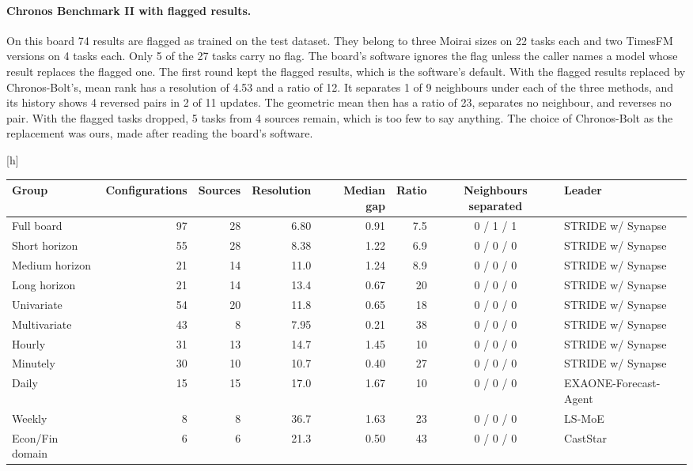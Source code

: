 \documentclass{article}
\makeatletter
\renewenvironment{table}
  {\setlength{\abovecaptionskip}{6\p@}%
   \setlength{\belowcaptionskip}{\z@}%
   \@float{table}}
  {\end@float}
\makeatother
\begin{document}
\paragraph{Chronos Benchmark II with flagged results.} On this board 74 results are flagged as
trained on the test dataset. They belong to three Moirai sizes on 22 tasks each and two TimesFM
versions on 4 tasks each. Only 5 of the 27 tasks carry no flag. The board's software
ignores the flag unless the caller names a model whose result replaces the flagged one. The
first round kept the flagged results, which is the software's default. With the flagged results
replaced by Chronos-Bolt's, mean rank has a resolution of 4.53 and a ratio of 12. It separates
1 of 9 neighbours under each of the three methods, and its history shows 4 reversed pairs in 2
of 11 updates. The geometric mean then has a ratio of 23, separates no neighbour, and reverses
no pair. With the flagged tasks dropped, 5 tasks from 4 sources remain, which is too few to say
anything. The choice of Chronos-Bolt as the replacement was ours, made after reading the
board's software.

\begin{table}[h]
\centering
\scriptsize
\setlength{\tabcolsep}{4pt}
\begin{tabular}{@{}lrrrrrcl@{}}
\toprule
\textbf{Group} & \textbf{Configurations} & \textbf{Sources} & \textbf{Resolution} &
\textbf{Median gap} & \textbf{Ratio} & \textbf{Neighbours separated} & \textbf{Leader} \\
\midrule
Full board & 97 & 28 & 6.80 & 0.91 & 7.5 & 0 / 1 / 1 & STRIDE w/ Synapse \\
Short horizon & 55 & 28 & 8.38 & 1.22 & 6.9 & 0 / 0 / 0 & STRIDE w/ Synapse \\
Medium horizon & 21 & 14 & 11.0 & 1.24 & 8.9 & 0 / 0 / 0 & STRIDE w/ Synapse \\
Long horizon & 21 & 14 & 13.4 & 0.67 & 20 & 0 / 0 / 0 & STRIDE w/ Synapse \\
Univariate & 54 & 20 & 11.8 & 0.65 & 18 & 0 / 0 / 0 & STRIDE w/ Synapse \\
Multivariate & 43 & 8 & 7.95 & 0.21 & 38 & 0 / 0 / 0 & STRIDE w/ Synapse \\
Hourly & 31 & 13 & 14.7 & 1.45 & 10 & 0 / 0 / 0 & STRIDE w/ Synapse \\
Minutely & 30 & 10 & 10.7 & 0.40 & 27 & 0 / 0 / 0 & STRIDE w/ Synapse \\
Daily & 15 & 15 & 17.0 & 1.67 & 10 & 0 / 0 / 0 & EXAONE-Forecast-Agent \\
Weekly & 8 & 8 & 36.7 & 1.63 & 23 & 0 / 0 / 0 & LS-MoE \\
Econ/Fin domain & 6 & 6 & 21.3 & 0.50 & 43 & 0 / 0 / 0 & CastStar \\
\bottomrule
\end{tabular}
\caption{GIFT-Eval's sub-boards with at least 6 sources, beside the full board. Each group is
ordered by mean rank on MASE within the group, which the app does not display. Resolution is
under CR2, in rank places. Neighbours separated are out of 9, uncorrected, under the submitted
version's rule, CR2 and the wild cluster bootstrap.}
\label{tab:subboards}
\end{table}
\end{document}
